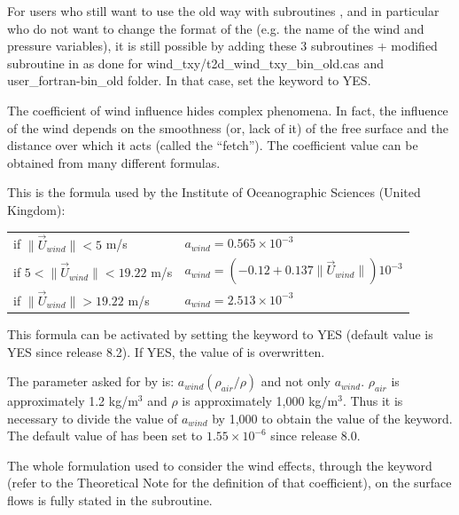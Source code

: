 \begin{itemize}
For users who still want to use the old way with subroutines
,  and
 in particular who do not want to change the format
of the  (e.g. the name of
the wind and pressure variables), it is still possible by adding these
3 subroutines + modified  subroutine in 
as done for wind\_txy/t2d\_wind\_txy\_bin\_old.cas and
user\_fortran-bin\_old folder.
In that case, set the keyword 
to YES.
\end{itemize}

The coefficient of wind influence hides complex phenomena. In fact, the
influence of the wind depends on the smoothness (or, lack of it) of the free
surface and the distance over which it acts (called the ``fetch''). The
coefficient value can be obtained from many different formulas.

This is the formula used by the Institute of Oceanographic Sciences (United
Kingdom):

\begin{tabular}{ll}
if $\| \vec{U}_{wind} \| < 5$ m/s & $a_{wind}  = 0.565 \times 10^{-3}$ \\
if $5 < \| \vec{U}_{wind} \| < 19.22$ m/s &
 $a_{wind} = (- 0.12 + 0.137 \| \vec{U}_{wind} \| ) 10^{-3}$ \\
if $\| \vec{U}_{wind} \| > 19.22$ m/s & $a_{wind} = 2.513 \times 10^{-3}$ \\
\end{tabular}

This formula can be activated by setting the keyword
 to YES
(default value is YES since release 8.2).
If YES, the value of  is overwritten.

The parameter  asked for by 
is: $a_{wind} (\rho_{air} / \rho)$ and not only $a_{wind}$.
$\rho_{air}$ is approximately 1.2 kg/m$^3$ and $\rho$
is approximately 1,000 kg/m$^3$. Thus it is necessary to divide the value of
$a_{wind}$ by 1,000 to obtain the value of the  keyword.
The default value of  has been set to
$1.55 \times 10^{-6}$ since release 8.0.

The whole formulation used to consider the wind effects, through the keyword
 (refer to the Theoretical Note for the
definition of that coefficient), on the surface flows is fully stated in the
 subroutine.

